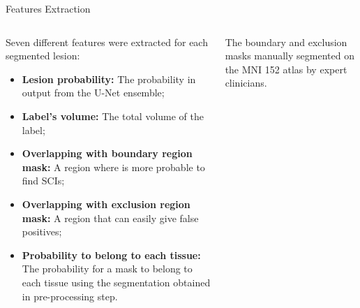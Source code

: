 \documentclass[]{standalone}
\begin{document}
	\begin{frame}{Features Extraction}{}
	
	
		\begin{columns}
			\begin{column}{0.50\textwidth}
			\footnotesize
			Seven different features were extracted for each segmented lesion:
				\begin{itemize}
				\item \textbf{Lesion probability:} The probability in output from the U-Net ensemble;
				\item \textbf{Label's volume:} The total volume of the label;
				\item \textbf{Overlapping with boundary region mask:} A region where is more probable to find SCIs;
				\item \textbf{Overlapping with exclusion region mask:} A region that can easily give false positives;
				\item \textbf{Probability to belong to each tissue:} The probability for a mask to belong to each tissue using the segmentation obtained in pre-processing step.
				\end{itemize}
			\end{column}
			\begin{column}{0.50\textwidth}
			
			\begin{alertblock}{}
				The boundary and exclusion masks manually segmented on the MNI 152 atlas by expert clinicians.
			\end{alertblock}
			
			\hspace{-10pt}
			\begin{figure}[h!]
			\centering
			\vspace{-20pt}


\end{figure}
\end{column}
\end{columns}
\end{frame}
\end{document}
